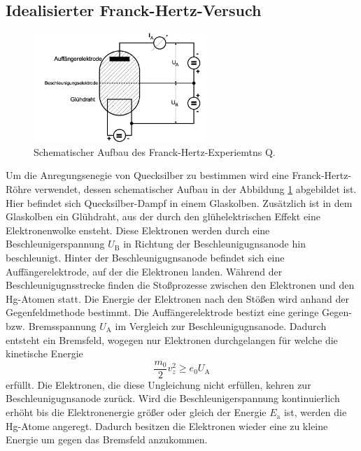 \subsection{Idealisierter Franck-Hertz-Versuch}
\label{sec:Idealisierter}
\begin{figure}[H]
  \centering
  \includegraphics[width=0.6\textwidth]{content/Bilder/schematischerAufbau.png}
  \caption{Schematischer Aufbau des Franck-Hertz-Experiemtns Q\cite{anleitungV601}.}
  \label{fig:schematischerAufbau}
\end{figure}
Um die Anregungsenegie von Quecksilber zu bestimmen wird eine Franck-Hertz-Röhre verwendet, dessen schematischer Aufbau in der Abbildung \ref{fig:schematischerAufbau}
abgebildet ist. Hier befindet sich Quecksilber-Dampf in einem Glaskolben. Zusätzlich ist in dem Glaskolben ein Glühdraht, aus der durch den glühelektrischen Effekt eine 
Elektronenwolke ensteht. Diese Elektronen werden durch eine Beschleunigerspannung $U_{\text{B}}$ in Richtung der Beschleunigugnsanode hin beschleunigt. Hinter der Beschleunigugnsanode
befindet sich eine Auffängerelektrode, auf der die Elektronen landen. Während der Beschleunigugnsstrecke finden die Stoßprozesse zwischen den Elektronen und den Hg-Atomen statt. 
Die Energie der Elektronen nach den Stößen wird anhand der Gegenfeldmethode bestimmt. Die Auffängerelektrode bestizt eine geringe Gegen- bzw. Bremsspannung $U_{\text{A}}$ im Vergleich zur Beschleunigugnsanode.
Dadurch entsteht ein Bremsfeld, wogegen nur Elektronen durchgelangen für welche die kinetische Energie
\begin{equation}
  \frac{m_0}{2} v_z^2 \geq e_0 U_{\text{A}}
  \label{eqn:kinetischeEnergieUngleichung}
\end{equation}
erfüllt. Die Elektronen, die diese Ungleichung nicht erfüllen, kehren zur Beschleunigugnsanode zurück. Wird die Beschleunigerspannung kontinuierlich erhöht bis die Elektronenergie
größer oder gleich der Energie $E_{\text{a}}$ ist, werden die Hg-Atome angeregt. Dadurch besitzen die Elektronen wieder eine zu kleine Energie um gegen das Bremsfeld anzukommen.
